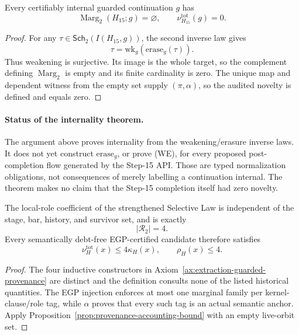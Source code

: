 \begin{theorem}
\label{thm:guarded-step15-internality}
Every certifiably internal guarded continuation \(g\) has
\[
  \operatorname{Marg}_2(H_{15};g)=\varnothing,
  \qquad
  \nu^{\mathrm{tot}}_{H_{15}}(g)=0.
\]
\end{theorem}

\begin{proof}
For any \(\tau\in\mathsf{Sch}_2(I(H_{15},g))\), the second inverse law gives
\[
  \tau=\mathrm{wk}_g(\mathrm{erase}_g(\tau)).
\]
Thus weakening is surjective. Its image is the whole target, so the complement
defining \(\operatorname{Marg}_2\) is empty and its finite cardinality is zero.
The unique map and dependent witness from the empty set supply
\((\pi,\alpha)\), so the audited novelty is defined and equals zero.
\end{proof}

\paragraph{Status of the internality theorem.}
The argument above proves internality from the weakening/erasure inverse laws.
It does not yet construct \(\mathrm{erase}_g\), or prove (WE), for every proposed
post-completion flow generated by the Step-15 API. Those are typed
normalization obligations, not consequences of merely labelling a continuation
internal. The theorem makes no claim that the Step-15 completion itself had
zero novelty.

\begin{proposition}
\label{prop:blind-four-role-bound}
The local-role coefficient of the strengthened Selective Law is independent of
the stage, bar, history, and survivor set, and is exactly
\[
  |\mathcal R_2|=4.
\]
Every semantically debt-free EGP-certified candidate therefore satisfies
\[
  \nu_H^{\mathrm{tot}}(x)\le4\kappa_H(x),
  \qquad
  \rho_H(x)\le4.
\]
\end{proposition}

\begin{proof}
The four inductive constructors in
Axiom~\ref{ax:extraction-guarded-provenance} are distinct and the definition
consults none of the listed historical quantities. The EGP injection enforces
at most one marginal family per kernel-clause/role tag, while
\(\alpha\) proves that every such tag is an actual semantic anchor. Apply
Proposition~\ref{prop:provenance-accounting-bound} with an empty live-orbit set.
\end{proof}

